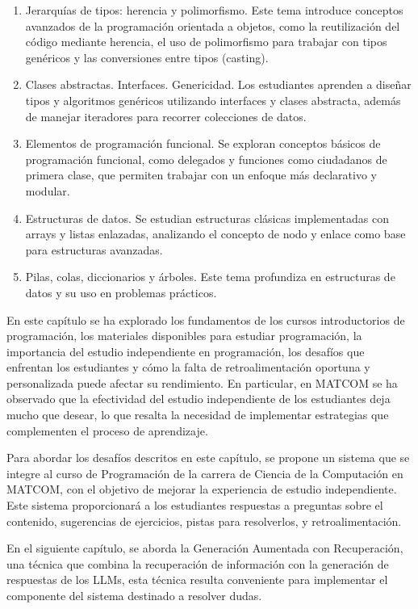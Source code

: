 \begin{enumerate}
    \item Jerarquías de tipos: herencia y polimorfismo.
    Este tema introduce conceptos avanzados de la programación orientada a objetos, como la reutilización del código mediante herencia, el uso de polimorfismo para trabajar con tipos genéricos y las conversiones entre tipos (casting).  

    \item Clases abstractas. Interfaces. Genericidad.
    Los estudiantes aprenden a diseñar tipos y algoritmos genéricos utilizando interfaces y clases abstracta, además de manejar iteradores para recorrer colecciones de datos.

    \item Elementos de programación funcional.
    Se exploran conceptos básicos de programación funcional, como delegados y funciones como ciudadanos de primera clase, que permiten trabajar con un enfoque más declarativo y modular.

    \item Estructuras de datos.
    Se estudian estructuras clásicas implementadas con arrays y listas enlazadas, analizando el concepto de nodo y enlace como base para estructuras avanzadas.  

    \item Pilas, colas, diccionarios y árboles.
    Este tema profundiza en estructuras de datos y su uso en problemas prácticos.
\end{enumerate}

En este capítulo se ha explorado los fundamentos de los cursos introductorios de programación, los materiales disponibles para estudiar programación, la importancia del estudio independiente en programación, los desafíos que enfrentan los estudiantes y cómo la falta de retroalimentación oportuna y personalizada puede afectar su rendimiento. En particular, en \mbox{MATCOM} se ha observado que la efectividad del estudio independiente de los estudiantes deja mucho que desear, lo que resalta la necesidad de implementar estrategias que complementen el proceso de aprendizaje.

Para abordar los desafíos descritos en este capítulo, se propone un sistema que se integre al curso de Programación de la carrera de Ciencia de la Computación en \mbox{MATCOM}, con el objetivo de  mejorar la experiencia de estudio independiente. Este sistema proporcionará  a los estudiantes respuestas a preguntas sobre el contenido, sugerencias de ejercicios, pistas para resolverlos, y retroalimentación.

En el siguiente capítulo, se aborda la Generación Aumentada con Recuperación, una técnica que combina la recuperación de información con la generación de respuestas de los LLMs, esta técnica resulta conveniente para implementar el componente del sistema destinado a resolver dudas.
